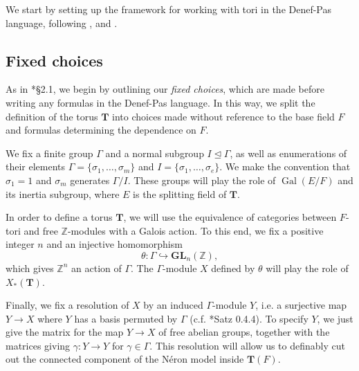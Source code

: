 \documentclass{amsart}
\newcommand{\Z}{{\mathbb Z}}
\newcommand{\GL}{\mathbf {GL}}
\newcommand{\bT}{\mathbf {T}}
\newcommand\spl{\mathrm{spl}}
\DeclareMathOperator{\Gal}{Gal}
\theoremstyle{plain}
\theoremstyle{definition}
\begin{document}
We start by setting up the framework for working with tori in the Denef-Pas language, following \cite{cluckers-hales-loeser}, \cite{CGH-2} and \cite{hales:transfert}.



\subsection{Fixed choices}\label{sub:fixedchoices}

As in \cite{hales:transfert}*{\S 2.1}, we begin by outlining our \emph{fixed choices}, which are made before writing any formulas in the Denef-Pas language.  
In this way, we split the definition of the torus $\bT$ into choices made without reference to the base field $F$ and formulas determining the dependence on $F$.

We fix a finite group $\Gamma$ and a normal subgroup $I \unlhd \Gamma$, as well as enumerations of their elements $\Gamma = \{\sigma_1, \dots, \sigma_m\}$ and $I = \{\sigma_1, \dots, \sigma_e\}$.  We make the convention that $\sigma_1 = 1$ and $\sigma_m$ generates $\Gamma / I$.  These groups will play the role of $\Gal(E/F)$ and its inertia subgroup, where $E$ is the splitting field of $\bT$.

In order to define a torus $\bT$, we will use the equivalence of categories between $F$-tori and free $\Z$-modules with a Galois action.  To this end, we fix a positive integer $n$ and an injective homomorphism
\begin{equation} \label{eq:theta}
\theta : \Gamma \hookrightarrow \GL_n(\Z),
\end{equation}
which gives $\Z^n$ an action of $\Gamma$.  The $\Gamma$-module $X$ defined by $\theta$ will play the role of $X_\ast(\bT)$.

Finally, we fix a resolution of $X$ by an induced $\Gamma$-module $Y$, i.e. a surjective map $Y \to X$ where $Y$ has a basis permuted by $\Gamma$ (c.f. \cite{brahm:thesis}*{Satz 0.4.4}).  To specify $Y$, we just give the matrix for the map $Y \to X$ of free abelian groups, together with the matrices giving $\gamma : Y \to Y$ for $\gamma \in \Gamma$. This resolution will allow us to definably cut out the connected component of the N\'eron model inside $\bT(F)$.

\end{document}
